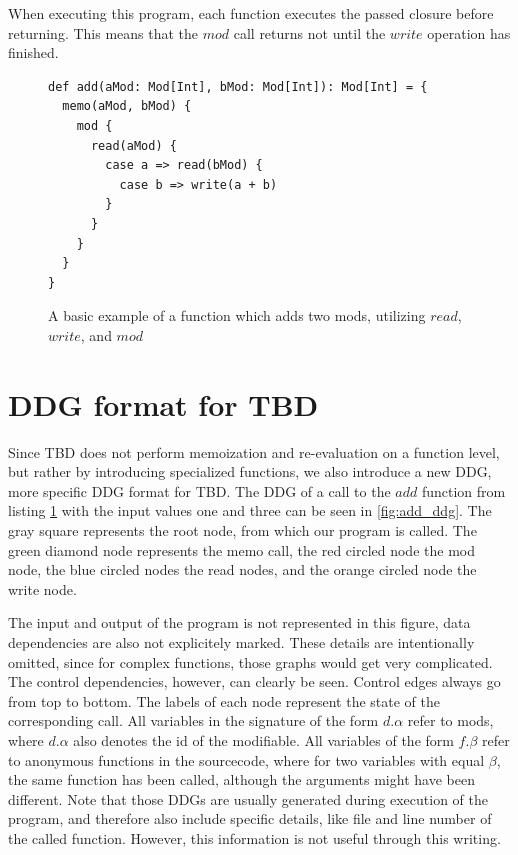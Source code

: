 When executing this program, each function executes the passed closure before returning. This means that the $mod$ call returns not until the $write$ operation has finished. 

\begin{figure}
\begin{lstlisting}[frame=single,basicstyle=\ttfamily]
def add(aMod: Mod[Int], bMod: Mod[Int]): Mod[Int] = {
  memo(aMod, bMod) {
    mod {
      read(aMod) {
        case a => read(bMod) {
          case b => write(a + b)
        }
      }
    }
  }
}

\end{lstlisting}
\caption{A basic example of a function which adds two mods, utilizing $read$, $write$, and $mod$}
\label{code:add_example}
\end{figure}

\section{DDG format for TBD}

Since TBD does not perform memoization and re-evaluation on a function level, but rather by introducing specialized functions, we also introduce a new DDG, more specific DDG format for TBD. The DDG of a call to the $add$ function from listing \ref{code:add_example} with the input values one and three can be seen in \ref{fig:add_ddg}. The gray square represents the root node, from which our program is called. The green diamond node represents the memo call, the red circled node the mod node, the blue circled nodes the read nodes, and the orange circled node the write node. 

The input and output of the program is not represented in this figure, data dependencies are also not explicitely marked. These details are intentionally omitted, since for complex functions, those graphs would get very complicated. The control dependencies, however, can clearly be seen. Control edges always go from top to bottom. The labels of each node represent the state of the corresponding call. All variables in the signature of the form $d.\alpha$ refer to mods, where $d.\alpha$ also denotes the id of the modifiable. All variables of the form $f.\beta$ refer to anonymous functions in the sourcecode, where for two variables with equal $\beta$, the same function has been called, although the arguments might have been different. Note that those DDGs are usually generated during execution of the program, and therefore also include specific details, like file and line number of the called function. However, this information is not useful through this writing.

